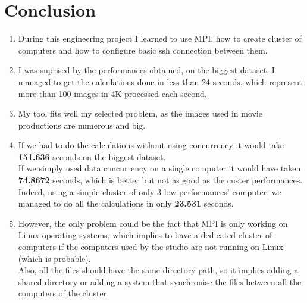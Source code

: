 \section{Conclusion}
\begin{enumerate}
    \item During this engineering project I learned to use MPI, how to create cluster of computers and how to configure basic ssh connection between them.\\
    \item  I was suprised by the performances obtained, on the biggest dataset, I managed to get the calculations done in less than 24 seconds, which represent more than 100 images in 4K processed each second.\\
    \item  My tool fits well my selected problem, as the images used in movie productions are numerous and big.\\
    \item  If we had to do the calculations without using concurrency it would take \textbf{151.636} seconds on the biggest dataset.\\
    If we simply used data concurrency on a single computer it would have taken \textbf{74.8672} seconds, which is better but not as good as the custer performances.\\
    Indeed, using a simple cluster of only 3 low performances' computer, we managed to do all the calculations in only \textbf{23.531} seconds.\\
    \item However, the only problem could be the fact that MPI is only working on Linux operating systems, which implies to have a dedicated cluster of computers if the computers used by the studio are not running on Linux (which is probable).\\
    Also, all the files should have the same directory path, so it implies adding a shared directory or adding a system that synchronise the files between all the computers of the cluster.
\end{enumerate}